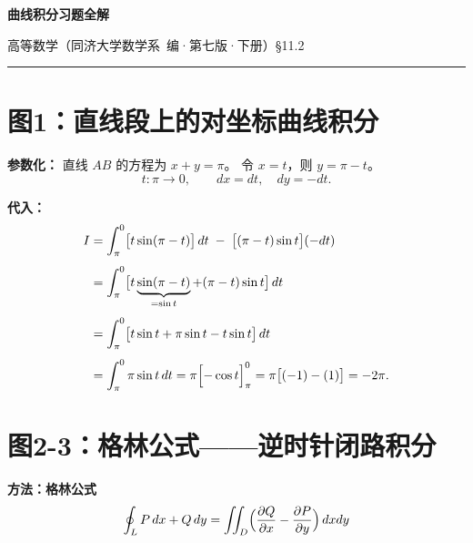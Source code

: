 \documentclass[12pt,a4paper]{ctexart}
\newcommand{\answerbox}[1]{%
  \begin{center}
  \fbox{\color{red}\large\bfseries #1}
  \end{center}
}
\begin{document}
\begin{center}
{\Huge\bfseries 曲线积分习题全解}

\bigskip
{\large 高等数学（同济大学数学系~编·第七版·下册）\S11.2}
\end{center}

\vspace{12pt}
\hrule
\vspace{12pt}

\section{图1：直线段上的对坐标曲线积分}


\bigskip

\noindent\textbf{参数化：} 直线 $AB$ 的方程为 $x+y=\pi$。
令 $x = t$，则 $y = \pi - t$。
\[
t: \pi \to 0,\qquad dx = dt,\quad dy = -dt.
\]

\noindent\textbf{代入：}
\[
\begin{aligned}
I &= \int_{\pi}^0 \bigl[t\sin(\pi-t)\bigr]\,dt \;-\; \bigl[(\pi-t)\sin t\bigr](-dt) \\[4pt]
  &= \int_{\pi}^0 \bigl[t\underbrace{\sin(\pi-t)}_{=\sin t} + (\pi-t)\sin t\bigr]\,dt \\[4pt]
  &= \int_{\pi}^0 \bigl[t\sin t + \pi\sin t - t\sin t\bigr]\,dt \\[4pt]
  &= \int_{\pi}^0 \pi\sin t\,dt
   = \pi\Bigl[-\cos t\Bigr]_{\pi}^0
   = \pi\bigl[(-1) - (1)\bigr]
   = -2\pi.
\end{aligned}
\]

\answerbox{$I = -2\pi$}

\newpage
\section{图2-3：格林公式——逆时针闭路积分}


\bigskip

\noindent\textbf{方法：格林公式}
\[
\oint_L P\,dx+Q\,dy = \iint_D \Bigl(\frac{\partial Q}{\partial x} - \frac{\partial P}{\partial y}\Bigr)\,dxdy
\]
\end{document}
